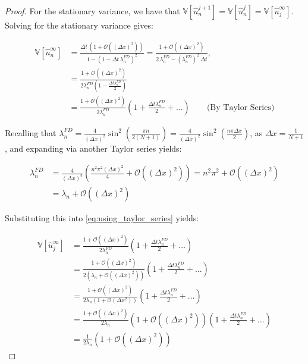 \begin{proof}
For the stationary variance, we have that 
$\mathbb{V}[\hat{u}_n^{j+1}] = 
\mathbb{V}[\hat{u}_n^{j}] = 
\mathbb{V}[\hat{u}_j^\infty]$. Solving for the stationary 
variance gives:

\begin{align}
\mathbb{V}[\hat u_n^\infty]
&= \frac{\Delta t\,(1 + \mathcal{O}\left((\Delta x)^2\right))}
       {1-(1-\Delta t\,\lambda_n^{FD})^2}
= \frac{1 + \mathcal{O}\left((\Delta x)^2\right)}
       {2\,\lambda_n^{FD} - (\lambda_n^{FD})^2\,\Delta t},
\label{eq:fourier_variance_stationary}
\\
&= \frac{1 + \mathcal{O}\left((\Delta x)^2\right)}
{2\lambda_n^{FD}(1 - \frac{\Delta t \lambda_n^{FD}}{2})}
\nonumber
\\
&= \frac{1 + \mathcal{O}\left((\Delta x)^2\right)}{2\lambda_n^{FD}}(1 + \frac{\Delta t \lambda_n^{FD}}{2}
+ \dots)\label{eq:using_taylor_series} \qquad 
\text{(By Taylor Series)}
\end{align}

Recalling that $\lambda_n^{FD} = \frac{4}{(\Delta x)^2}
\sin^2\left(\frac{\pi n}{2(N+1)}\right) = \frac{4}{(\Delta x)^2}
\sin^2\left(\frac{n \pi \Delta x}{2}\right)$, as $\Delta x = \frac{1}
{N+1}$, and expanding via another Taylor series yields:

\begin{align*}
    \lambda_n^{FD} &= \frac{4}{(\Delta x)^2}\left(\frac{n^2 
    \pi^2 (\Delta x)^2}{4} + \mathcal{O}((\Delta x)^2)\right) = 
    n^2\pi^2 + \mathcal{O}((\Delta x)^2) \\
    &= \lambda_n + \mathcal{O}((\Delta x)^2)
\end{align*}

Substituting this into \eqref{eq:using_taylor_series} yields:

\begin{align*}
    \mathbb{V}[\hat{u}_j^\infty] &= 
    \frac{1 + \mathcal{O}\left((\Delta x)^2\right)}{2\lambda_n^{FD}}\left(1 + 
    \frac{\Delta t \lambda_n^{FD}}{2} + \dots\right) \\
    &= \frac{1 + \mathcal{O}\left((\Delta x)^2\right)}
    {2\left(\lambda_n + \mathcal{O}\left((\Delta x)^2\right)\right)}
    \left(1 + \frac{\Delta t \lambda_n^{FD}}{2} + \dots\right) \\
    &= \frac{1 + \mathcal{O}\left((\Delta x)^2\right)}{2 
    \lambda_n \left(1 + \mathcal{O}(\Delta x^2)\right)}
    \left(1 + \frac{\Delta t \lambda_n^{FD}}{2} + \dots\right) \\
    &= \frac{1 + \mathcal{O}\left((\Delta x)^2\right)}{2 
    \lambda_n}\left(1 + \mathcal{O}\left((\Delta x)^2\right)\right)\left(1 + \frac{\Delta t \lambda_n^{FD}}{2} + \dots\right) \\
    &= \frac{1}{2 \lambda_n}\left(1 + \mathcal{O}\left((\Delta x)^2\right)\right)
    \label{eq:final_result}
\end{align*}


\end{proof}
